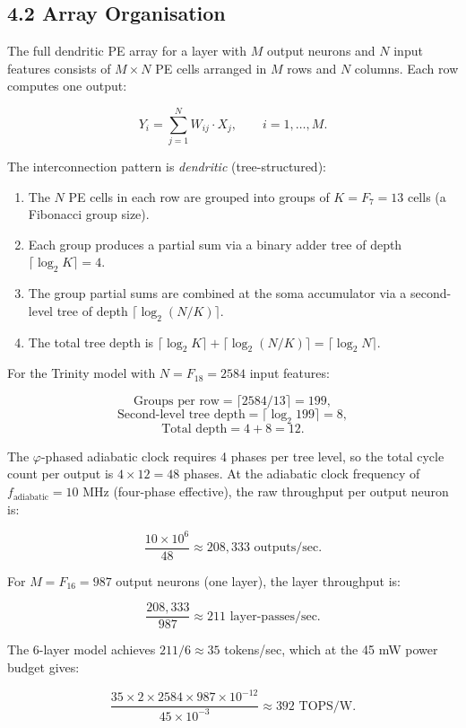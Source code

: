 \subsection{4.2 Array Organisation}

The full dendritic PE array for a layer with \(M\) output neurons and
\(N\) input features consists of \(M \times N\) PE cells arranged in
\(M\) rows and \(N\) columns. Each row computes one output:

\[
Y_i = \sum_{j=1}^{N} W_{ij} \cdot X_j, \qquad i = 1, \ldots, M.
\]

The interconnection pattern is \emph{dendritic} (tree-structured):

\begin{enumerate}
\item The \(N\) PE cells in each row are grouped into groups of
  \(K = F_7 = 13\) cells (a Fibonacci group size).
\item Each group produces a partial sum via a binary adder tree of
  depth \(\lceil \log_2 K \rceil = 4\).
\item The group partial sums are combined at the soma accumulator via
  a second-level tree of depth
  \(\lceil \log_2(N/K) \rceil\).
\item The total tree depth is
  \(\lceil \log_2 K \rceil + \lceil \log_2(N/K) \rceil
  = \lceil \log_2 N \rceil\).
\end{enumerate}

For the Trinity model with \(N = F_{18} = 2584\) input features:

\[
\text{Groups per row} = \lceil 2584 / 13 \rceil = 199,
\]
\[
\text{Second-level tree depth} = \lceil \log_2 199 \rceil = 8,
\]
\[
\text{Total depth} = 4 + 8 = 12.
\]

The \(\varphi\)-phased adiabatic clock requires 4 phases per tree
level, so the total cycle count per output is
\(4 \times 12 = 48\) phases. At the adiabatic clock frequency of
\(f_{\text{adiabatic}} = 10\) MHz (four-phase effective), the raw
throughput per output neuron is:

\[
\frac{10 \times 10^6}{48} \approx 208{,}333 \text{ outputs/sec}.
\]

For \(M = F_{16} = 987\) output neurons (one layer), the layer
throughput is:

\[
\frac{208{,}333}{987} \approx 211 \text{ layer-passes/sec}.
\]

The 6-layer model achieves \(211 / 6 \approx 35\) tokens/sec, which
at the 45 mW power budget gives:

\[
\frac{35 \times 2 \times 2584 \times 987 \times 10^{-12}}{45 \times 10^{-3}}
\approx 392 \text{ TOPS/W}.
\]

